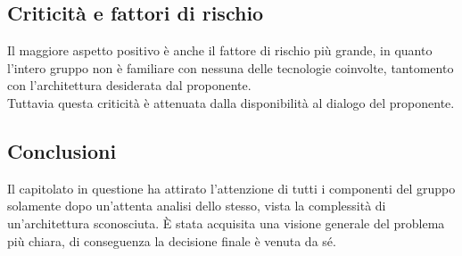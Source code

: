 \subsection{Criticità e fattori di rischio}
Il maggiore aspetto positivo è anche il fattore di rischio più grande, in quanto l'intero gruppo non è familiare con nessuna delle tecnologie coinvolte, tantomento con l'architettura desiderata dal proponente.\\
Tuttavia questa criticità è attenuata dalla disponibilità al dialogo del proponente.

\subsection{Conclusioni}
Il capitolato in questione ha attirato l'attenzione di tutti i componenti del gruppo solamente dopo un'attenta analisi dello stesso, vista la complessità di un'architettura sconosciuta. È stata acquisita una visione generale del problema più chiara, di conseguenza la decisione finale è venuta da sé.

\newpage